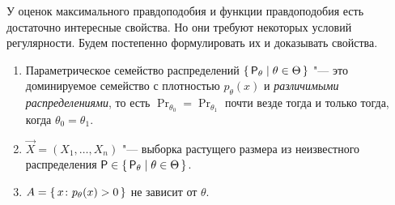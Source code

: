 У оценок максимального правдоподобия и функции правдоподобия есть достаточно интересные свойства. Но они требуют некоторых условий регулярности. Будем постепенно формулировать их и доказывать свойства.
\begin{enumerate}[label=(R\arabic*)]
    \item Параметрическое семейство распределений $\set{\mathsf{P}_{\theta} \mid \theta \in \Theta}$ "--- это доминируемое семейство с плотностью $p_{\theta}(x)$ и \emph{различимыми распределениями}, то есть $\Pr_{\theta_{0}} = \Pr_{\theta_{1}}$ почти везде тогда и только тогда, когда $\theta_{0} = \theta_{1}$.
    
    \item $\vec{X} = (X_{1}, \ldots, X_{n})$ "--- выборка растущего размера из неизвестного распределения $\mathsf{P} \in \set{\mathsf{P}_{\theta} \mid \theta \in \Theta}$.
    
    \item $A = \set{x \colon p_{\theta}(x) > 0}$ не зависит от $\theta$.
\end{enumerate}

